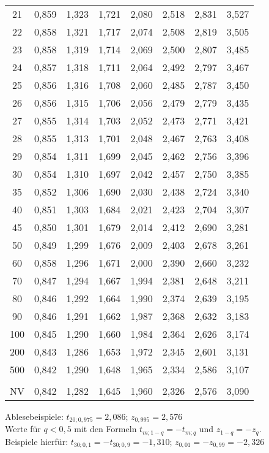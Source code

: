 \begin{table}[h]
\begin{tabular}{|c|ccccccc|}
21 & 0,859 & 1,323 & 1,721 & 2,080 & 2,518 & 2,831 & 3,527 \\
22 & 0,858 & 1,321 & 1,717 & 2,074 & 2,508 & 2,819 & 3,505 \\
23 & 0,858 & 1,319 & 1,714 & 2,069 & 2,500 & 2,807 & 3,485 \\
24 & 0,857 & 1,318 & 1,711 & 2,064 & 2,492 & 2,797 & 3,467 \\
25 & 0,856 & 1,316 & 1,708 & 2,060 & 2,485 & 2,787 & 3,450 \\ \hline
26 & 0,856 & 1,315 & 1,706 & 2,056 & 2,479 & 2,779 & 3,435 \\
27 & 0,855 & 1,314 & 1,703 & 2,052 & 2,473 & 2,771 & 3,421 \\
28 & 0,855 & 1,313 & 1,701 & 2,048 & 2,467 & 2,763 & 3,408 \\
29 & 0,854 & 1,311 & 1,699 & 2,045 & 2,462 & 2,756 & 3,396 \\
30 & 0,854 & 1,310 & 1,697 & 2,042 & 2,457 & 2,750 & 3,385 \\ \hline
35 & 0,852 & 1,306 & 1,690 & 2,030 & 2,438 & 2,724 & 3,340 \\
40 & 0,851 & 1,303 & 1,684 & 2,021 & 2,423 & 2,704 & 3,307 \\
45 & 0,850 & 1,301 & 1,679 & 2,014 & 2,412 & 2,690 & 3,281 \\
50 & 0,849 & 1,299 & 1,676 & 2,009 & 2,403 & 2,678 & 3,261 \\ \hline
60 & 0,858 & 1,296 & 1,671 & 2,000 & 2,390 & 2,660 & 3,232 \\
70 & 0,847 & 1,294 & 1,667 & 1,994 & 2,381 & 2,648 & 3,211 \\
80 & 0,846 & 1,292 & 1,664 & 1,990 & 2,374 & 2,639 & 3,195 \\
90 & 0,846 & 1,291 & 1,662 & 1,987 & 2,368 & 2,632 & 3,183 \\
100 & 0,845 & 1,290 & 1,660 & 1,984 & 2,364 & 2,626 & 3,174 \\ \hline
200 & 0,843 & 1,286 & 1,653 & 1,972 & 2,345 & 2,601 & 3,131 \\
500 & 0,842 & 1,290 & 1,648 & 1,965 & 2,334 & 2,586 & 3,107 \\
{} & {} & {} & {} & {} & {} & {} & {}\\
NV & 0,842 & 1,282 & 1,645 & 1,960 & 2,326 & 2,576 & 3,090 \\ \hline 
\end{tabular}
\end{table}

\noindent
Ablesebeispiele: $t_{20;0,975}=2,086$; $z_{0,995} = 2,576$\\
\noindent
Werte für $q<0,5$ mit den Formeln $t_{m;1-q} = -t_{m;q}$ und $z_{1-q}=-z_q$.\\
Beispiele hierfür: $t_{30;0,1}=-t_{30;0,9}=-1,310$; $z_{0,01}=-z_{0,99}=-2,326$
